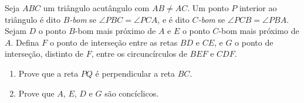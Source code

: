 Seja $ABC$ um triângulo acutângulo com $AB \neq AC$. Um ponto $P$ interior ao triângulo é dito \emph{$B$-bom} se $\angle PBC = \angle PCA$, e é dito \emph{$C$-bom} se $\angle PCB = \angle PBA$.
Sejam $D$ o ponto $B$-bom mais próximo de $A$ e $E$ o ponto $C$-bom mais próximo de $A$.
Defina $F$ o ponto de interseção entre as retas $BD$ e $CE$, e $G$ o ponto de interseção, distinto de $F$, entre os circuncírculos de $BEF$ e $CDF$.

\begin{enumerate}[label = (\alph*)]
	\item Prove que a reta $PQ$ é perpendicular a reta $BC$.
	\item Prove que $A$, $E$, $D$ e $G$ são concíclicos.
\end{enumerate}
